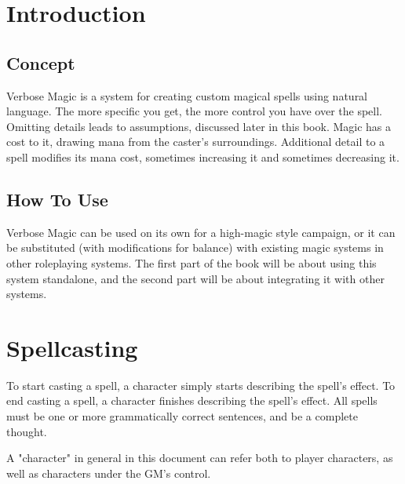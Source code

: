 \documentclass[10pt,a4paper,twocolumn,openany]{book}
\begin{document}
\selectfont %
\frontmatter

\rpgMakeCover[
    title = Verbose Magic,
    subtitle = Created by Cassandra de la Cruz-Munoz \\ \today \\ \url{https://github.com/cass-dlcm/verbose-magic}
]


\tableofcontents

\mainmatter

\chapter{Introduction}

\section{Concept}
Verbose Magic is a system for creating custom magical spells using natural language.
The more specific you get, the more control you have over the spell.
Omitting details leads to assumptions, discussed later in this book.
Magic has a cost to it, drawing mana from the caster's surroundings.
Additional detail to a spell modifies its mana cost, sometimes increasing it and sometimes decreasing it.

\section{How To Use}
Verbose Magic can be used on its own for a high-magic style campaign, or it can be substituted (with modifications for balance) with existing magic systems in other roleplaying systems.
The first part of the book will be about using this system standalone, and the second part will be about integrating it with other systems.	

\chapter{Spellcasting}
To start casting a spell, a character simply starts describing the spell's effect.
To end casting a spell, a character finishes describing the spell's effect.
All spells must be one or more grammatically correct sentences, and be a complete thought.

\begin{rpg-commentbox}
	A "character" in general in this document can refer both to player characters, as well as characters under the GM's control.
\end{rpg-commentbox}
\end{document}
